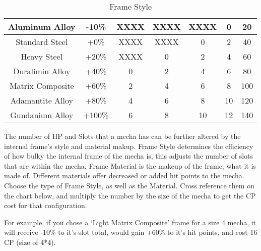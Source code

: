 \documentclass[twoside]{book}
\begin{document}
\begin{enumerate}
\begin{table}[htb]
\begin{center}
\begin{tabular}{|c|c|c|c|c|c|c|}
\hline

 Aluminum Alloy & -10\% & XXXX & XXXX & XXXX & 0 & 20 \\

\hline

 Standard Steel & +0\% & XXXX & XXXX & 0 & 2 & 40 \\

\hline

 Heavy Steel & +20\% & XXXX & 0 & 2 & 4 & 60 \\

\hline

 Duralimin Alloy & +40\% & 0 & 2 & 4 & 6 & 80 \\

\hline

 Matrix Composite & +60\% & 2 & 4 & 6 & 8 & 100 \\

\hline

 Adamantite Alloy & +80\% & 4 & 6 & 8 & 10 & 120 \\

\hline

 Gundanium Alloy & +100\% & 6 & 8 & 10 & 12 & 140 \\

\hline


  \end{tabular}
  
\caption{Frame Style}
  
  \end{center}
\end{table}
    
                  
    {  
      The number of HP and Slots that a mecha has can
                   be further altered by the internal frame's style
                   and material makup. Frame Style determines the
                   efficiency of how bulky the internal frame of the
                   mecha is, this adjusts the number of slots that are
                   within the mecha. Frame Material is the makeup of the
                   frame, what it is made of. Different materials offer
                   decreased or added hit points to the mecha. Choose the
                   type of Frame Style, as well as the Material. Cross
                   reference them on the chart below, and multiply the
                   number by the size of the mecha to get the CP cost for
                   that configuration. 
    }
  
                  
    {  
      For example, if you chose a `Light Matrix
                   Composite' frame for a size 4 mecha, it will
                   receive -10\% to it's slot total, would gain +60\%
                   to it's hit points, and cost 16 CP (size of
                   4*4). 
    }
  

\end{enumerate}
\end{document}
